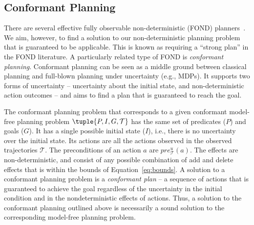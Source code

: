 \subsection{Conformant Planning}
There are several effective fully observable non-deterministic (FOND) planners~\cite{cimatti2003weak,kissmann2009solving}. We aim, however, to find a  solution to our non-deterministic planning problem that is guaranteed to be applicable. This is known as requiring a ``strong plan'' in the FOND literature. A particularly related type of FOND is {\em conformant planning}. Conformant planning can be seen as a middle ground between classical planning and full-blown planning under uncertainty (e.g., MDPs). It supports two forms of uncertainty -- uncertainty about the initial state, and non-deterministic action outcomes -- and aims to find a plan that is guaranteed to reach the goal.






The conformant planning problem that corresponds to a given conformant model-free planning problem $\tuple{P,I,G, \mathcal{T}}$ has the same set of predicates ($P$) and goals ($G$). It has a single possible initial state ($I$), i.e., there is no uncertainty over the initial state. Its actions are all the actions observed in the observed trajectories $\mathcal{T}$. The preconditions of an action $a$ are $pre_\mathcal{T}^u(a)$. The effects are non-deterministic, and consist of any possible combination of 
add and delete effects that is within the bounds of Equation~\ref{eq:bounds}. A solution to a conformant planning problem is a {\em conformant plan} -- a sequence of actions that is guaranteed to achieve the goal regardless of the uncertainty in the initial condition and in the nondeterministic effects of actions. Thus, a solution to the conformant planning outlined above is necessarily a sound solution to the corresponding model-free planning problem. 


